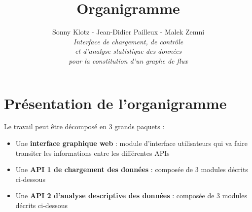 
\geometry{top=3cm,bottom=3cm}

\title{\vspace{\fill}\textbf{\Huge Organigramme}}
\author{Sonny Klotz - Jean-Didier Pailleux - Malek Zemni\vspace{2em}\\\textit{Interface de chargement, de contrôle}\\\textit{et d’analyse statistique des données}\\\textit{pour la constitution d’un graphe de flux}\vspace{2em}}


\clearpage
\maketitle\vspace{\fill}
\newpage\clearpage{}
	
	\section{Présentation de l'organigramme}
		Le travail peut être décomposé en 3 grands paquets :
		\begin{itemize}
		\item Une \textbf{interface graphique web} : module d'interface utilisateurs qui va faire transiter les informations entre les différentes APIs
		\item Une \textbf{API 1 de chargement des données} : composée de 3 modules décrits ci-dessous
		\item Une \textbf{API 2 d'analyse descriptive des données} : composée de 3 modules décrits ci-dessous
		\end{itemize}
		
